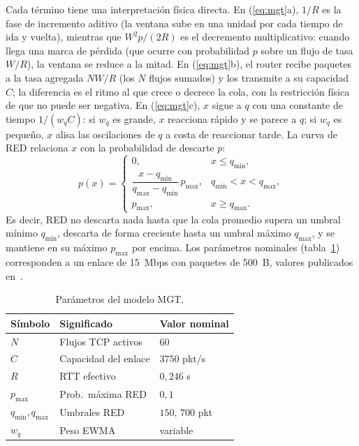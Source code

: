 \documentclass[10pt,a4paper]{article}
\begin{document}
Cada término tiene una interpretación física directa. En (\ref{eq:mgt}a),
$1/R$ es la fase de incremento aditivo (la ventana sube en una unidad por
cada tiempo de ida y vuelta), mientras que $W^2 p / (2R)$ es el
decremento multiplicativo: cuando llega una marca de pérdida (que ocurre
con probabilidad $p$ sobre un flujo de tasa $W/R$), la ventana se reduce
a la mitad. En (\ref{eq:mgt}b), el router recibe paquetes a la tasa
agregada $NW/R$ (los $N$ flujos sumados) y los transmite a su capacidad
$C$; la diferencia es el ritmo al que crece o decrece la cola, con la
restricción física de que no puede ser negativa. En (\ref{eq:mgt}c), $x$
sigue a $q$ con una constante de tiempo $1/(w_q C)$: si $w_q$ es grande,
$x$ reacciona rápido y se parece a $q$; si $w_q$ es pequeño, $x$ alisa
las oscilaciones de $q$ a costa de reaccionar tarde. La curva de RED
relaciona $x$ con la probabilidad de descarte $p$:
\begin{equation}
p(x)=
\begin{cases}
0, & x\le q_{\min},\\
\dfrac{x-q_{\min}}{q_{\max}-q_{\min}}\,p_{\max}, & q_{\min}<x<q_{\max},\\
p_{\max}, & x\ge q_{\max}.
\end{cases}
\label{eq:red}
\end{equation}
Es decir, RED no descarta nada hasta que la cola promedio supera un
umbral mínimo $q_{\min}$, descarta de forma creciente hasta un umbral
máximo $q_{\max}$, y se mantiene en su máximo $p_{\max}$ por encima. Los
parámetros nominales (tabla~\ref{tab:params}) corresponden a un enlace
de 15~Mbps con paquetes de 500~B, valores publicados
en~\cite{hollot2002}.

\begin{table}[h]
\centering
\small
\caption{Parámetros del modelo MGT.}
\label{tab:params}
\begin{tabular}{lll}
\toprule
Símbolo & Significado & Valor nominal \\
\midrule
$N$ & Flujos TCP activos & $60$ \\
$C$ & Capacidad del enlace & $3750$ pkt/s \\
$R$ & RTT efectivo & $0{,}246$ s \\
$p_{\max}$ & Prob.\ máxima RED & $0{,}1$ \\
$q_{\min},q_{\max}$ & Umbrales RED & $150,\,700$ pkt \\
$w_q$ & Peso EWMA & variable \\
\bottomrule
\end{tabular}
\end{table}
\end{document}
